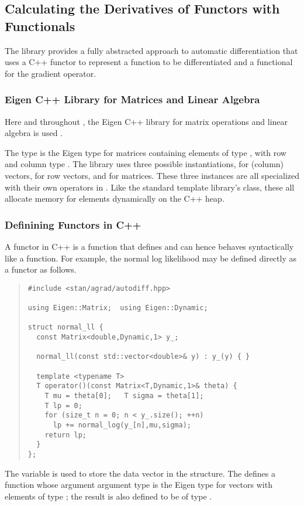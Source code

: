 \documentclass[10pt]{article}
\begin{document}
\subsection{Calculating the Derivatives of Functors with Functionals}

The  library provides a fully abstracted approach to
automatic differentiation that uses a C++ functor to represent a
function to be differentiated and a functional for the gradient
operator.  

\subsubsection{Eigen C++ Library for Matrices and Linear Algebra} 

Here and throughout , the Eigen C++ library for
matrix operations and linear algebra is used \cite{Eigen:2013}.

The type  is the Eigen type for matrices
containing elements of type , with row and column type
.  The  library uses three possible
instantiations,  for (column) vectors,
 for row vectors, and
 for matrices.  These three instances
are all specialized with their own operators in .  Like
the standard template library's  class, these all
allocate memory for elements dynamically on the C++ heap.

\subsubsection{Definining Functors in C++}

A functor in C++ is a function that defines  and can
hence behaves syntactically like a function.  For example, the normal log
likelihood may be defined directly as a functor as follows.
%
\begin{quote}
\begin{Verbatim}
#include <stan/agrad/autodiff.hpp>

using Eigen::Matrix;  using Eigen::Dynamic;

struct normal_ll {
  const Matrix<double,Dynamic,1> y_;

  normal_ll(const std::vector<double>& y) : y_(y) { }

  template <typename T>
  T operator()(const Matrix<T,Dynamic,1>& theta) {
    T mu = theta[0];   T sigma = theta[1];
    T lp = 0;
    for (size_t n = 0; n < y_.size(); ++n)
      lp += normal_log(y_[n],mu,sigma);
    return lp;
  }
};
\end{Verbatim}
\end{quote}
%
The variable  is used to store the data vector in the
structure.  The  defines a function whose argument
argument type is the Eigen type for vectors with elements of type
; the result is also defined to be of type . 
\end{document}
